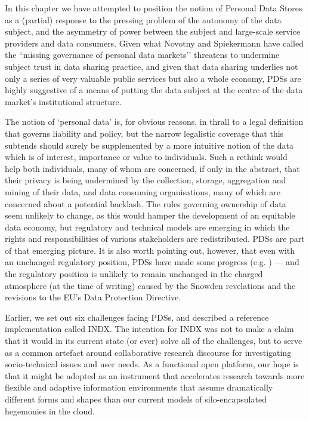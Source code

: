 \documentclass[graybox]{svmult}
\begin{document}
In this chapter we have attempted to position the notion of Personal Data Stores as a (partial) response to the pressing problem of the autonomy of the data subject, and the asymmetry of power between the subject and large-scale service providers and data consumers. Given what Novotny and Spiekermann have called the ``missing governance of personal data markets’’ \cite{novotny2013} threatens to undermine subject trust in data sharing practice, and given that data sharing underlies not only a series of very valuable public services but also a whole economy, PDSs are highly suggestive of a means of putting the data subject at the centre of the data market’s institutional structure.

The notion of `personal data’ is, for obvious reasons, in thrall to a legal definition that governs liability and policy, but the narrow legalistic coverage that this subtends should surely be supplemented by a more intuitive notion of the data which is of interest, importance or value to individuals. Such a rethink would help both individuals, many of whom are concerned, if only in the abstract, that their privacy is being undermined by the collection, storage, aggregation and mining of their data, and data consuming organisations, many of which are concerned about a potential backlash. The rules governing ownership of data seem unlikely to change, as this would hamper the development of an equitable data economy, but regulatory and technical models are emerging in which the rights and responsibilities of various stakeholders are redistributed. PDSs are part of that emerging picture. It is also worth pointing out, however, that even with an unchanged regulatory position, PDSs have made some progress (e.g. \cite{heath2013}) --- and the regulatory position is unlikely to remain unchanged in the charged atmosphere (at the time of writing) caused by the Snowden revelations and the revisions to the EU’s Data Protection Directive.

Earlier, we set out six challenges facing PDSs, and described a reference implementation called INDX.  The intention for INDX was not to make a claim that it would in its current state (or ever) solve all of the challenges, but to serve as a common artefact around collaborative research discourse for investigating socio-technical issues and user needs.  As a functional open platform, our hope is that it might be adopted as an instrument that accelerates research towards more flexible and adaptive information environments that assume dramatically different forms and shapes than our current models of silo-encapsulated hegemonies in the cloud.
\end{document}
